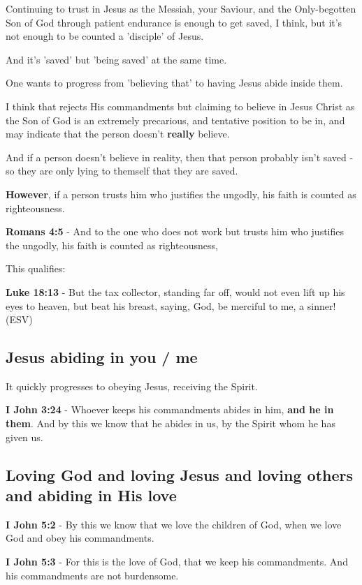 \documentclass[11pt]{article}
\begin{document}
Continuing to trust in Jesus as the Messiah, your Saviour, and the Only-begotten Son of God through patient endurance is enough to get saved, I think, but it's not enough to be counted a 'disciple' of Jesus.

And it's 'saved' but 'being saved' at the same time.

One wants to progress from 'believing that' to having Jesus abide inside them.

I think that rejects His commandments but claiming to believe in Jesus Christ as the Son of God is an extremely precarious, and tentative position to be in,
and may indicate that the person doesn't \textbf{really} believe.

And if a person doesn't believe in reality, then that person probably isn't saved - so they are only lying to themself that they are saved.

\textbf{However}, if a person trusts him who justifies the ungodly, his faith is counted as righteousness.

\textbf{Romans 4:5} - And to the one who does not work but trusts him who justifies the ungodly, his faith is counted as righteousness,

This qualifies:

\textbf{Luke 18:13} - But the tax collector, standing far off, would not even lift up his eyes to heaven, but beat his breast, saying, God, be merciful to me, a sinner! (ESV)

\subsection{Jesus abiding in \textbf{you} / \textbf{me}}
\label{sec:org52cbaef}
It quickly progresses to obeying Jesus, receiving the Spirit.

\textbf{I John 3:24} - Whoever keeps his commandments abides in him, \textbf{and he in them}. And by this we know that he abides in us, by the Spirit whom he has given us.

\subsection{Loving God and loving Jesus and loving others and abiding in His love}
\label{sec:orge871fcb}
\textbf{I John 5:2} - By this we know that we love the children of God, when we love God and obey his commandments.

\textbf{I John 5:3} - For this is the love of God, that we keep his commandments. And his commandments are not burdensome.
\end{document}
